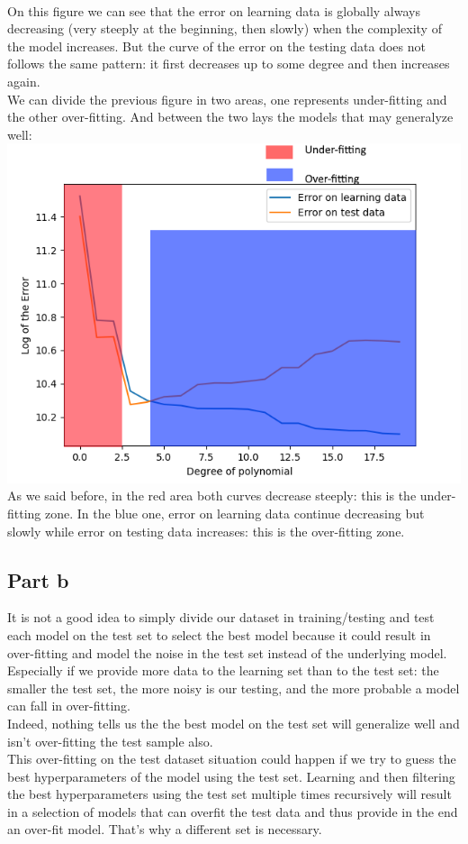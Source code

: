 \documentclass[a4paper, 10pt]{article}
\begin{document}
\\
On this figure we can see that the error on learning data is globally always decreasing (very steeply at the beginning, then slowly)
when the complexity of the model increases. But the curve of the error on the testing data does not follows the same pattern: it first 
decreases up to some degree and then increases again. 
\\
We can divide the previous figure in two areas, one represents under-fitting and the other over-fitting. And between the 
two lays the models that may generalyze well:
\\
\includegraphics{ex1a_area}
\\
As we said before, in the red area both curves decrease steeply: this is the under-fitting zone.
In the blue one, error on learning data continue decreasing but slowly while error on testing data increases:
this is the over-fitting zone.

\subsection{Part b}
It is not a good idea to simply divide our dataset in training/testing and
test each model on the test set to select the best model because it could result in over-fitting
and model the noise in the test set instead of the underlying model. Especially if we 
provide more data to the learning set than to the test set: the smaller the test set,
the more noisy is our testing, and the more probable a model can fall in over-fitting.
\\
Indeed, nothing tells us the the best model on the test set will generalize well and isn't 
over-fitting the test sample also.
\\
This over-fitting on the test dataset situation could happen if we try to guess the best hyperparameters of
the model using the test set. Learning and then filtering the best hyperparameters using the test set
multiple times recursively will result in a selection of models that can overfit the test data and thus 
provide in the end an over-fit model. That's why a different set is necessary.
\end{document}
